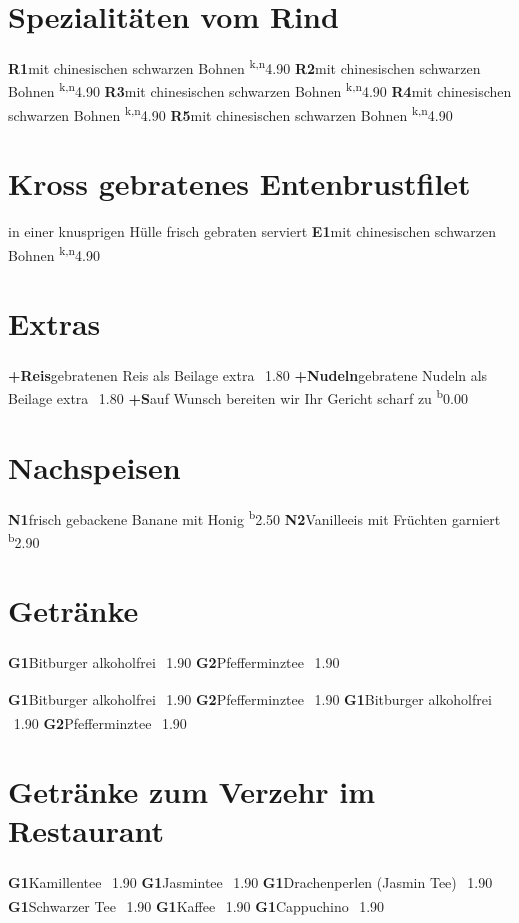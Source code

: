 \documentclass[a4paper,10pt,notumble]{leaflet}
\newcommand{\meal}[4]{\textbf{#1}\hspace{3mm}#2 \textsuperscript{#3}\hfill\SI{#4}{\EUR}\newline}
\newcommand{\Fisch}{b}
\newcommand{\Senf}{k}
\newcommand{\Erdnuss}{n}
\begin{document}
\section*{Spezialitäten vom Rind}
\meal{R1}{mit chinesischen schwarzen Bohnen}{\Senf,\Erdnuss}{4.90}
\meal{R2}{mit chinesischen schwarzen Bohnen}{\Senf,\Erdnuss}{4.90}
\meal{R3}{mit chinesischen schwarzen Bohnen}{\Senf,\Erdnuss}{4.90}
\meal{R4}{mit chinesischen schwarzen Bohnen}{\Senf,\Erdnuss}{4.90}
\meal{R5}{mit chinesischen schwarzen Bohnen}{\Senf,\Erdnuss}{4.90}

\section*{Kross gebratenes Entenbrustfilet}
in einer knusprigen Hülle frisch gebraten serviert
\meal{E1}{mit chinesischen schwarzen Bohnen}{\Senf,\Erdnuss}{4.90}


\section*{Extras} 
\meal{+Reis}{gebratenen Reis als Beilage extra}{~}{1.80}
\meal{+Nudeln}{gebratene Nudeln als Beilage extra}{~}{1.80}
\meal{+S}{auf Wunsch bereiten wir Ihr Gericht scharf zu}{\Fisch}{0.00}

\section*{Nachspeisen} 
\meal{N1}{frisch gebackene Banane mit Honig}{\Fisch}{2.50}
\meal{N2}{Vanilleeis mit Früchten garniert}{\Fisch}{2.90}

\vspace{0.5cm}
\section*{Getränke}
\meal{G1}{Bitburger alkoholfrei}{~}{1.90}
\meal{G2}{Pfefferminztee}{~}{1.90}

\meal{G1}{Bitburger alkoholfrei}{~}{1.90}
\meal{G2}{Pfefferminztee}{~}{1.90}
\meal{G1}{Bitburger alkoholfrei}{~}{1.90}
\meal{G2}{Pfefferminztee}{~}{1.90}

\section*{Getränke zum Verzehr im Restaurant}
\meal{G1}{Kamillentee}{~}{1.90}
\meal{G1}{Jasmintee}{~}{1.90}
\meal{G1}{Drachenperlen (Jasmin Tee)}{~}{1.90}
\meal{G1}{Schwarzer Tee}{~}{1.90}
\meal{G1}{Kaffee}{~}{1.90}
\meal{G1}{Cappuchino}{~}{1.90}
\end{document}
